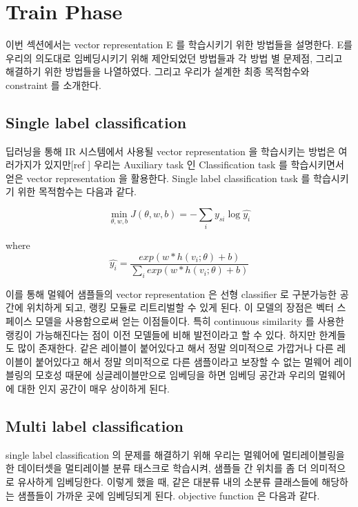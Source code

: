 \section{Train Phase}
이번 섹션에서는 vector representation E 를 학습시키기 위한 방법들을 설명한다. E를 우리의 의도대로 임베딩시키기 위해 제안되었던 방법들과 각 방법 별 문제점, 그리고 해결하기 위한 방법들을 나열하였다. 그리고 우리가 설계한 최종 목적함수와 constraint 를 소개한다. 


\subsection{Single label classification}
 딥러닝을 통해 IR 시스템에서 사용될 vector representation 을 학습시키는 방법은 여러가지가 있지만[ref ] 우리는 Auxiliary task 인 Classification task 를 학습시키면서 얻은 vector representation 을 활용한다. Single label classification task 를 학습시키기 위한 목적함수는 다음과 같다.

\begin{equation}
\label{eqn:01}
\min_{\theta,w,b} J(\theta, w, b) = -\sum_i{y_{si} \log{\hat{y_i}}}
\end{equation}

where 
\[
\hat{y_i} = \frac{exp(w*h(v_i;\theta)+b)}{\sum_i{exp(w*h(v_i;\theta)+b)}}
\]

 이를 통해 멀웨어 샘플들의 vector representation 은 선형 classifier 로 구분가능한 공간에 위치하게 되고, 랭킹 모듈로 리트리벌할 수 있게 된다. 이 모델의 장점은 벡터 스페이스 모델을 사용함으로써 얻는 이점들이다. 특히 continuous similarity 를 사용한 랭킹이 가능해진다는 점이 이전 모델들에 비해 발전이라고 할 수 있다. 하지만 한계들도 많이 존재한다. 같은 레이블이 붙어있다고 해서 정말 의미적으로 가깝거나 다른 레이블이 붙어있다고 해서 정말 의미적으로 다른 샘플이라고 보장할 수 없는 멀웨어 레이블링의 모호성 때문에 싱글레이블만으로 임베딩을 하면 임베딩 공간과 우리의 멀웨어에 대한 인지 공간이 매우 상이하게 된다. 


\subsection{Multi label classification}
single label classification 의 문제를 해결하기 위해 우리는 멀웨어에 멀티레이블링을 한 데이터셋을 멀티레이블 분류 태스크로 학습시켜, 샘플들 간 위치를 좀 더 의미적으로 유사하게 임베딩한다. 이렇게 했을 때, 같은 대분류 내의 소분류 클래스들에 해당하는 샘플들이 가까운 곳에 임베딩되게 된다. objective function 은 다음과 같다. 

